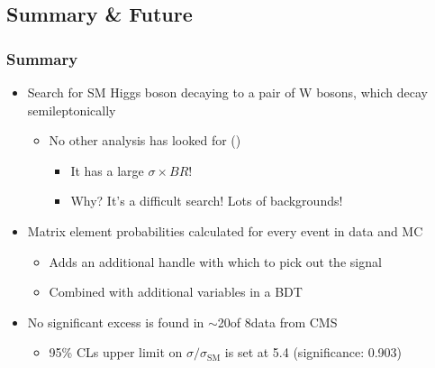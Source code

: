 

\subsection*{Summary \& Future}


\begin{frame}
	\frametitle{Summary}
	\vspace*{-0.24cm}
	\begin{block}{}
		\begin{itemize}
			\item Search for SM Higgs boson decaying to a pair of W bosons, which decay semileptonically
			\begin{itemize}
				\item No other analysis has looked for \HWWlvjj (\gev)
				\begin{itemize}
					\item It has a large $\sigma\times{BR}$!
					\item Why? It's a difficult search! Lots of backgrounds!
				\end{itemize}
			\end{itemize}
			\item Matrix element probabilities calculated for every event in data and MC
			\begin{itemize}
				\item Adds an additional handle with which to pick out the signal
				\item Combined with additional variables in a BDT
			\end{itemize}
			\item No significant excess is found in $\sim$20\fbinv of 8\TeV data from CMS
			\begin{itemize}
				\item 95\% CLs upper limit on $\sigma/\sigma_{\text{SM}}$ is set at 5.4 (significance: 0.903)

\end{itemize}
\end{itemize}
\end{block}
\end{frame}
